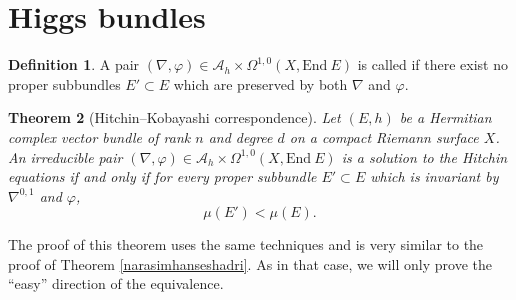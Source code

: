 \documentclass[12pt,a4paper]{book}
\newtheorem{thm}{Theorem}[section]
\theoremstyle{definition} \newtheorem{defn}[thm]{Definition}
\theoremstyle{definition} \newtheorem{ejemplo}[thm]{Example}
\theoremstyle{remark} \newtheorem{rem}[thm]{Remark}
\def\AA{\mathscr{A}}
\def\End{\mathrm{End}}
\let\emph\relax
\begin{document}
	  \section{Higgs bundles}
	  \begin{defn}
	    A pair $(\nabla,\varphi) \in \AA_h \times \Omega^{1,0}(X,\End\ E)$ is called \emph{irreducible} if there exist no proper subbundles $E'\subset E$ which are preserved by both $\nabla$ and $\varphi$. 
	  \end{defn}
	  \begin{thm}[Hitchin--Kobayashi correspondence] \label{Hitchin correspondence}
	    Let $(E,h)$ be a Hermitian complex vector bundle of rank $n$ and degree $d$ on a compact Riemann surface $X$.
	    An irreducible pair $(\nabla ,\varphi) \in \AA_h \times \Omega^{1,0}(X,\End\ E)$ is a solution to the Hitchin equations if and only if for every proper subbundle $E'\subset E$ which is invariant by $\nabla^{0,1}$ and $\varphi$,
	    \begin{equation*}
	      \mu(E')<\mu(E).
	    \end{equation*}
	  \end{thm}
	  The proof of this theorem uses the same techniques and is very similar to the proof of Theorem \ref{narasimhanseshadri}. As in that case, we will only prove the ``easy'' direction of the equivalence.
\end{document}
